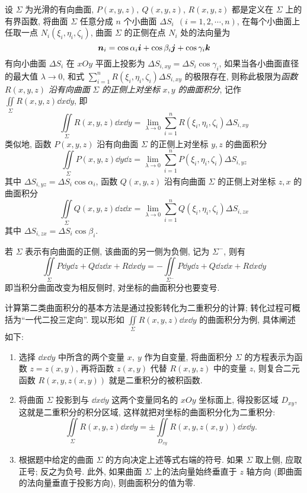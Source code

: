 \begin{definition}
    设 $\varSigma$ 为光滑的有向曲面, $P(x,y,z),~Q(x,y,z)$, $R(x,y,z)$ 都是定义在 $\varSigma$ 上的有界函数, 将曲面 $\varSigma$ 任意分成 $n$ 个小曲面 $\Delta S_i~~(i=1,2,\cdots,n)$, 在每个小曲面上任取一点 $N_i(\xi_i,\eta_i,\zeta_i)$, 
    曲面 $\varSigma$ 的正侧在点 $N_i$ 处的法向量为 $$\vb*{n}_i=\cos\alpha_i\vb*{i}+\cos\beta_i\vb*{j}+\cos\gamma_i\vb*{k}$$
    有向小曲面 $\Delta S_i$ 在 $xOy$ 平面上投影为 $\Delta S_{i,xy}=\Delta S_i\cos\gamma_i$, 如果当各小曲面直径的最大值 $\lambda\to0$, 和式 $\displaystyle\sum_{i=1}^{n}R(\xi_i,\eta_i,\zeta_i)\Delta S_{i,xy}$ 的极限存在, 
    则称此极限为\textit{函数} $R(x,y,z)$ \textit{沿有向曲面} $\varSigma$ \textit{的正侧上对坐标} $x,y$ \textit{的曲面积分}, 记作 $\displaystyle\iint\limits_\varSigma R(x,y,z)\dd x\dd y$, 即 
    $$\iint\limits_\varSigma R(x,y,z)\dd x\dd y=\lim_{\lambda\to0}\sum_{i=1}^{n}R(\xi_i,\eta_i,\zeta_i)\Delta S_{i,xy}$$
    类似地, 函数 $P(x,y,z)$ 沿有向曲面 $\varSigma$ 的正侧上对坐标 $y,z$ 的曲面积分 
    $$\iint\limits_\varSigma P(x,y,z)\dd y\dd z=\lim_{\lambda\to0}\sum_{i=1}^{n}P(\xi_i,\eta_i,\zeta_i)\Delta S_{i,yz}$$
    其中 $\Delta S_{i,yz}=\Delta S_{i}\cos\alpha_i$, 
    函数 $Q(x,y,z)$ 沿有向曲面 $\varSigma$ 的正侧上对坐标 $z,x$ 的曲面积分 
    $$\iint\limits_\varSigma Q(x,y,z)\dd z\dd x=\lim_{\lambda\to0}\sum_{i=1}^{n}Q(\xi_i,\eta_i,\zeta_i)\Delta S_{i,zx}$$
    其中 $\Delta S_{i,zx}=\Delta S_{i}\cos\beta_i$.
\end{definition}

\begin{theorem}
    若 $\varSigma$ 表示有向曲面的正侧, 该曲面的另一侧为负侧, 记为 $\varSigma^-$, 则有 
    $$\iint\limits_\varSigma P\dd y\dd z+Q\dd z\dd x+R\dd x\dd y=-\iint\limits_{\varSigma^-} P\dd y\dd z+Q\dd z\dd x+R\dd x\dd y$$
    即当积分曲面改变为相反侧时, 对坐标的曲面积分也要变号.
\end{theorem}

计算第二类曲面积分的基本方法是通过投影转化为二重积分的计算; 转化过程可概括为“一代二投三定向”.
现以形如 $\displaystyle\iint\limits_\varSigma R(x,y,z)\dd x\dd y$ 的曲面积分为例, 具体阐述如下:
\begin{enumerate}[label=(\arabic{*})]
    \item 选择 $\dd x\dd y$ 中所含的两个变量 $x,~y$ 作为自变量, 将曲面积分 $\varSigma$ 的方程表示为函数 $z=z(x,y)$, 再将函数 $z(x,y)$ 代替 $R(x,y,z)$ 中的变量 $z$, 则复合二元函数 $R(x,y,z(x,y))$ 就是二重积分的被积函数.
    \item 将曲面 $\varSigma$ 投影到与 $\dd x\dd y$ 这两个变量同名的 $xOy$ 坐标面上, 得投影区域 $D_{xy}$, 这就是二重积分的积分区域, 这样就把对坐标的曲面积分化为二重积分:
          $$\iint\limits_\varSigma R(x,y,z)\dd x\dd y=\pm\iint\limits_{D_{xy}}R(x,y,z(x,y))\dd x\dd y.$$
    \item 根据题中给定的曲面 $\varSigma$ 的方向决定上述等式右端的符号. 如果 $\varSigma$ 取上侧, 应取正号; 反之为负号. 此外, 如果曲面 $\varSigma$ 上的法向量始终垂直于 $z$ 轴方向 (即曲面的法向量垂直于投影方向), 则曲面积分的值为零.
\end{enumerate}

